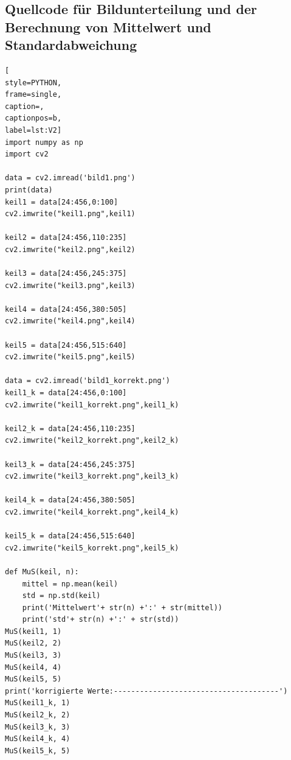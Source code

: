 \documentclass[12pt, oneside, a4paper, \docLanguage]{report}
\begin{document}
\subsection{Quellcode für Bildunterteilung und der Berechnung von Mittelwert und Standardabweichung}
\label{chap:APPENDIX_SOURCECODE_V2}
\begin{lstlisting}[
style=PYTHON,
frame=single,
caption=,
captionpos=b,
label=lst:V2]
import numpy as np
import cv2

data = cv2.imread('bild1.png')
print(data)
keil1 = data[24:456,0:100]
cv2.imwrite("keil1.png",keil1)

keil2 = data[24:456,110:235]
cv2.imwrite("keil2.png",keil2)

keil3 = data[24:456,245:375]
cv2.imwrite("keil3.png",keil3)

keil4 = data[24:456,380:505]
cv2.imwrite("keil4.png",keil4)

keil5 = data[24:456,515:640]
cv2.imwrite("keil5.png",keil5)

data = cv2.imread('bild1_korrekt.png')
keil1_k = data[24:456,0:100]
cv2.imwrite("keil1_korrekt.png",keil1_k)

keil2_k = data[24:456,110:235]
cv2.imwrite("keil2_korrekt.png",keil2_k)

keil3_k = data[24:456,245:375]
cv2.imwrite("keil3_korrekt.png",keil3_k)

keil4_k = data[24:456,380:505]
cv2.imwrite("keil4_korrekt.png",keil4_k)

keil5_k = data[24:456,515:640]
cv2.imwrite("keil5_korrekt.png",keil5_k)

def MuS(keil, n):
    mittel = np.mean(keil)
    std = np.std(keil)
    print('Mittelwert'+ str(n) +':' + str(mittel))
    print('std'+ str(n) +':' + str(std))
MuS(keil1, 1)
MuS(keil2, 2)
MuS(keil3, 3)
MuS(keil4, 4)
MuS(keil5, 5)
print('korrigierte Werte:--------------------------------------')
MuS(keil1_k, 1)
MuS(keil2_k, 2)
MuS(keil3_k, 3)
MuS(keil4_k, 4)
MuS(keil5_k, 5)
\end{lstlisting}
\end{document}
